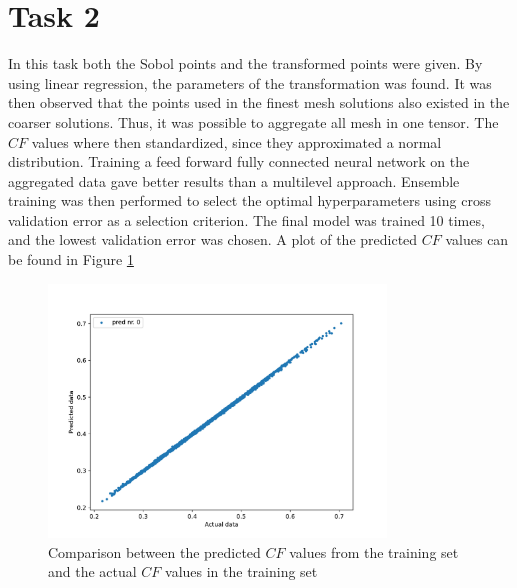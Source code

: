 \documentclass[a4paper]{article}
\begin{document}
\section*{Task 2}
In this task both the Sobol points and the transformed points were given. By using linear regression, the parameters of the transformation was found. It was then observed that the points used in the finest mesh solutions also existed in the coarser solutions. Thus, it was possible to aggregate all mesh in one tensor. The $CF$ values where then standardized, since they approximated a normal distribution. 
Training a feed forward fully connected neural network on the aggregated data gave better results than a multilevel\cite{lye2020multilevel} approach. Ensemble training was then performed to select the optimal hyperparameters using cross validation error as a selection criterion. The final model was trained 10 times, and the lowest validation error was chosen. A plot of the predicted $CF$ values can be found in Figure \ref{fig:task2}  
\begin{figure}[ht]
    \centering
    \includegraphics[width=0.8\textwidth]{figures/task2/final.pdf}
    \caption{Comparison between the predicted $CF$ values from the training set and the actual $CF$ values in the training set}
    \label{fig:task2}
\end{figure}
\end{document}
